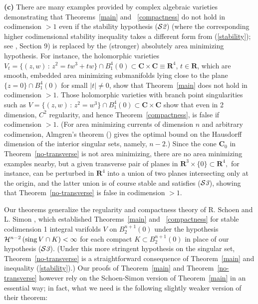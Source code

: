\documentclass[a4paper,11pt]{amsart}
\begin{document}
\noindent 
{\bf(c)} There are many examples provided by 
complex algebraic varieties demonstrating that Theorems~\ref{main} and ~\ref{compactness} do not hold in codimension $>1$ even if the stability hypothesis (${\mathcal S}{\emph2}$) (where the corresponding higher codimensional  stability inequality takes a different form from (\ref{stability}); see \cite{S1}, Section 9) is replaced by the (stronger) absolutely area minimizing hypothesis. For instance, the  holomorphic varieties $V_{t} = \{(z, w) \, : \, z^{2} = tw^{3} + tw\} \cap B_{1}^{4}(0)  \subset {\mathbf C} \times {\mathbf C} \equiv {\mathbf R}^{4}$,  $t \in {\mathbf R}$, which are smooth, embedded area minimizing submanifolds lying close to the plane $\{z=0\} \cap B_{1}^{4}(0)$  for small $|t| \neq 0$, show that Theorem~\ref{main} does not hold in codimension $>1$. Those holomorphic varieties with branch point singularities such as $V = \{(z, w) \, : \, z^{2} = w^{3}\} \cap B_{1}^{4}(0)
\subset {\mathbf C} \times {\mathbf C}$ show that even in 2 dimension, $C^{2}$ regularity, and hence Theorem~\ref{compactness}, is false if codimension $> 1$. (For area minimizing currents of dimension $n$ and arbitrary codimension, Almgren's theorem (\cite{A}) gives the optimal bound on the Hausdorff dimension of the interior singular sets, namely, $n-2.$) Since the cone ${\mathbf C}_{0}$ in 
Theorem~\ref{no-transverse} is not area minimizing, there are no area minimizing examples nearby, but 
a given transverse pair of planes in ${\mathbf R}^{3} \times\{0\} \subset {\mathbf R}^{4},$ for instance, can be perturbed in ${\mathbf R}^{4}$ into a union of two planes intersecting only at the origin, and the latter union is of course stable and satisfies (${\mathcal S}{\emph 3}$), showing that Theorem~\ref{no-transverse} is false in codimension $> 1.$ 

  
Our theorems generalize the regularity and compactness theory of R. Schoen and L. Simon \cite{SS}, which established Theorems~\ref{main} and ~\ref{compactness} for stable codimension 1 integral varifolds $V$ on $B_{2}^{n+1}(0)$ under the hypothesis 
${\mathcal H}^{n-2} \, ({\rm sing} \, V \cap K) < \infty$ for each compact $K \subset B_{2}^{n+1}(0)$ in place of our hypothesis (${\mathcal S{\emph 3}}$). (Under this more stringent hypothesis on the singular set, Theorem~\ref{no-transverse} is a straightforward consequence of Theorem~\ref{main} and inequality (\ref{stability}).) Our proofs of Theorem~\ref{main} and Theorem~\ref{no-transverse} however rely on the Schoen-Simon version of Theorem~\ref{main} in an essential way; in fact, what we need is the following slightly weaker version of their theorem:
\end{document}
